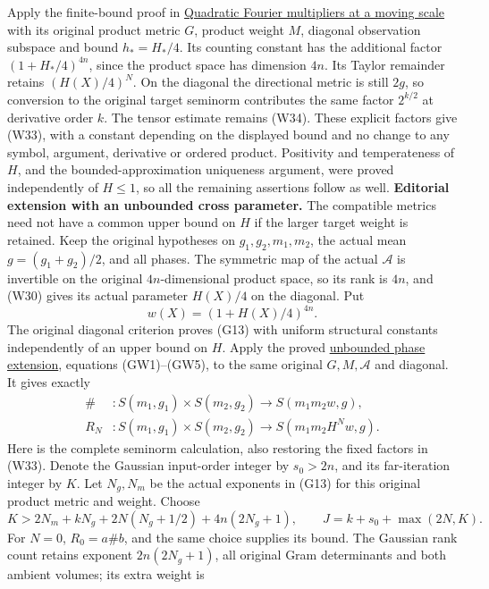 \documentclass[
  11pt,
]{article}
\begin{document}
Apply the finite-bound proof in
\href{gauss-transform-estimates.pdf\#section*.49}{Quadratic
Fourier multipliers at a moving scale} with its original product metric
\(G\), product weight \(M\), diagonal observation subspace and bound
\(h_*=H_*/4\). Its counting constant has the additional factor
\((1+H_*/4)^{4n}\), since the product space has dimension \(4n\). Its
Taylor remainder retains \((H(X)/4)^N\). On the diagonal the directional
metric is still \(2g\), so conversion to the original target seminorm
contributes the same factor \(2^{k/2}\) at derivative order \(k\). The
tensor estimate remains (W34). These explicit factors give (W33), with a
constant depending on the displayed bound and no change to any symbol,
argument, derivative or ordered product. Positivity and temperateness of
\(H\), and the bounded-approximation uniqueness argument, were proved
independently of \(H\leq1\), so all the remaining assertions follow as
well. \textbf{Editorial extension with an unbounded cross parameter.}
The compatible metrics need not have a common upper bound on \(H\) if
the larger target weight is retained. Keep the original hypotheses on
\(g_1,g_2,m_1,m_2\), the actual mean \(g=(g_1+g_2)/2\), and all phases.
The symmetric map of the actual \(\mathcal A\) is invertible on the
original \(4n\)-dimensional product space, so its rank is \(4n\), and
(W30) gives its actual parameter \(H(X)/4\) on the diagonal. Put \[
 w(X)=(1+H(X)/4)^{4n}.
 \tag{WG1}
\] The original diagonal criterion proves (G13) with uniform structural
constants independently of an upper bound on \(H\). Apply the proved
\href{gauss-transform-estimates.pdf\#section*.49}{unbounded
phase extension}, equations (GW1)--(GW5), to the same original
\(G,M,\mathcal A\) and diagonal. It gives exactly \[
 \begin{aligned}
 \# &:S(m_1,g_1)\times S(m_2,g_2)\longrightarrow S(m_1m_2w,g),\\
 R_N &:S(m_1,g_1)\times S(m_2,g_2)
                       \longrightarrow S(m_1m_2H^Nw,g).
 \end{aligned}
 \tag{WG2}
\] Here is the complete seminorm calculation, also restoring the fixed
factors in (W33). Denote the Gaussian input-order integer by \(s_0>2n\),
and its far-iteration integer by \(K\). Let \(N_g,N_m\) be the actual
exponents in (G13) for this original product metric and weight. Choose
\[
 K>2N_m+kN_g+2N(N_g+1/2)+4n(2N_g+1),\qquad
 J=k+s_0+\max(2N,K).
 \tag{WG3}
\] For \(N=0\), \(R_0=a\#b\), and the same choice supplies its bound.
The Gaussian rank count retains exponent \(2n(2N_g+1)\), all original
Gram determinants and both ambient volumes; its extra weight is
\end{document}
